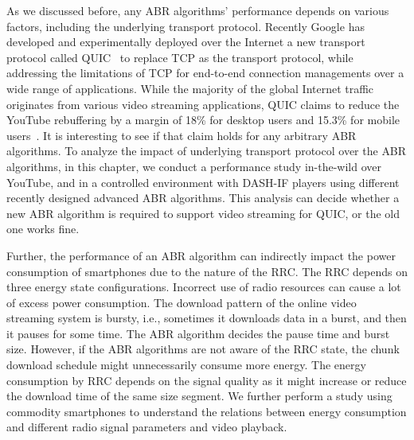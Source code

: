 As we discussed before, any \ac{ABR} algorithms' performance depends on various factors, including the underlying transport protocol. 
Recently Google has developed and experimentally deployed over the Internet a new transport protocol called \ac{QUIC}~\cite{langley2017quic} to replace \ac{TCP} as the transport protocol, while addressing the limitations of \ac{TCP} for end-to-end connection managements over a wide range of applications. While the majority of the global Internet traffic originates from various video streaming applications, \ac{QUIC} claims to reduce the YouTube rebuffering by a margin of 18\% for desktop users and 15.3\% for mobile users~\cite{langley2017quic}.  It is interesting to see if that claim holds for any arbitrary \ac{ABR} algorithms. To analyze the impact of underlying transport protocol over the \ac{ABR} algorithms, in this chapter, we conduct a performance study in-the-wild over YouTube, and in a controlled environment with \ac{DASH-IF} players using different recently designed advanced \ac{ABR} algorithms. This analysis can decide whether a new \ac{ABR} algorithm is required to support video streaming for \ac{QUIC}, or the old one works fine.

Further, the performance of an \ac{ABR} algorithm can indirectly impact the power consumption of smartphones due to the nature of the \ac{RRC}. The \ac{RRC} depends on three energy state configurations. Incorrect use of radio resources can cause a lot of excess power consumption. The download pattern of the online video streaming system is bursty, i.e., sometimes it downloads data in a burst, and then it pauses for some time. The \ac{ABR} algorithm decides the pause time and burst size. However, if the \ac{ABR} algorithms are not aware of the \ac{RRC} state, the chunk download schedule might unnecessarily consume more energy. The energy consumption by \ac{RRC} depends on the signal quality as it might increase or reduce the download time of the same size segment. We further perform a study using commodity smartphones to understand the relations between energy consumption and different radio signal parameters and video playback. 

\begin{comment}
In summary, the contributions in this chapter are as follows. 
\begin{enumerate}
	\item Similarly to the previous chapter, we first conduct a study over YouTube to analyze YouTube \ac{ABR} performance over \ac{TCP} and \ac{QUIC}. 
	\item We then perform a study over a controlled environment, to explore how different modern \ac{ABR} algorithms like BOLA, MPC, Pensieve, etc. work over \ac{QUIC} in comparison to \ac{TCP}. 
	\item Finally, to understand the impact of \ac{ABR} streaming over the energy consumption of a mobile device, we conduct a through experiment using commodity smartphones and commercial cellular network connections. 
\end{enumerate}
\end{comment}

